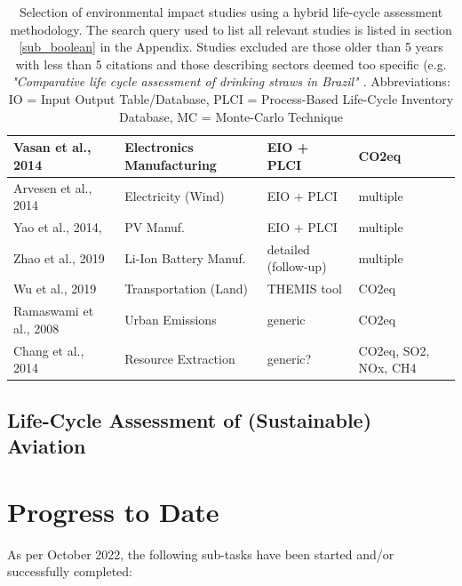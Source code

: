 \documentclass{article}
\begin{document}
\begin{table}[H]
\begin{tabularx}{\textwidth}{| X | X | X | X |}
                \hline
                    Vasan et al., 2014 \cite{vasan_carbon_2014} & Electronics Manufacturing & EIO + PLCI & CO2eq \\
                \hline
                    Arvesen et al., 2014 \cite{arvesen_life_2014} & Electricity (Wind) & EIO + PLCI & multiple \\
                \hline
                    Yao et al., 2014, \cite{yao_hybrid_2014} & PV Manuf. & EIO + PLCI & multiple \\
                \hline
                    Zhao et al., 2019 \cite{zhao_comparative_2019} & Li-Ion Battery Manuf. & detailed (follow-up) & multiple \\
                \hline
                    Wu et al., 2019 \cite{wu_assessing_2019} & Transportation (Land) & THEMIS tool \cite{gibon_methodology_2015} & CO2eq \\
                \hline
                    Ramaswami et al., 2008 \cite{ramaswami_demand-centered_2008} & Urban Emissions & generic & CO2eq \\
                \hline
                    Chang et al., 2014 \cite{chang_shale--well_2014} & Resource Extraction & generic? & CO2eq, SO2, NOx, CH4 \\
                \hline
            \end{tabularx}
            \caption{Selection of environmental impact studies using a hybrid life-cycle assessment methodology. The search query used to list all relevant studies is listed in section \ref{sub_boolean} in the Appendix. Studies excluded are those older than 5 years with less than 5 citations and those describing sectors deemed too specific (e.g. \textit{"Comparative life cycle assessment of drinking straws in Brazil" \cite{zanghelini_comparative_2020}}. Abbreviations: IO = Input Output Table/Database, PLCI = Process-Based Life-Cycle Inventory Database, MC = Monte-Carlo Technique}
        \end{table}

    \subsection{Life-Cycle Assessment of (Sustainable) Aviation}

\newpage
\section{Progress to Date}

    As per October 2022, the following sub-tasks have been started and/or successfully completed:
    
\end{document}
